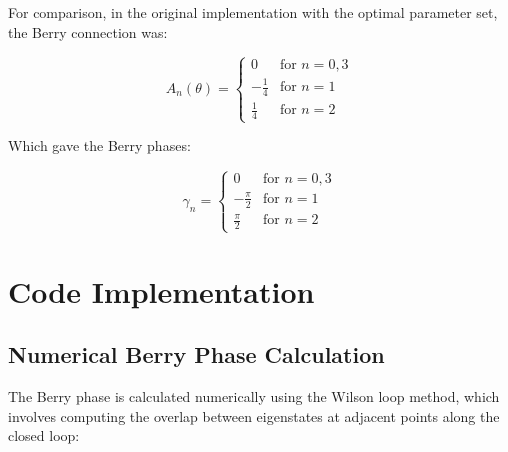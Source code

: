 \documentclass[12pt,a4paper]{article}
\begin{document}
For comparison, in the original implementation with the optimal parameter set, the Berry connection was:

\begin{equation}
A_n(\theta) = \begin{cases}
0 & \text{for } n = 0, 3 \\
-\frac{1}{4} & \text{for } n = 1 \\
\frac{1}{4} & \text{for } n = 2
\end{cases}
\end{equation}

Which gave the Berry phases:

\begin{equation}
\gamma_n = \begin{cases}
0 & \text{for } n = 0, 3 \\
-\frac{\pi}{2} & \text{for } n = 1 \\
\frac{\pi}{2} & \text{for } n = 2
\end{cases}
\end{equation}

\section{Code Implementation}

\subsection{Numerical Berry Phase Calculation}

The Berry phase is calculated numerically using the Wilson loop method, which involves computing the overlap between eigenstates at adjacent points along the closed loop:
\end{document}
